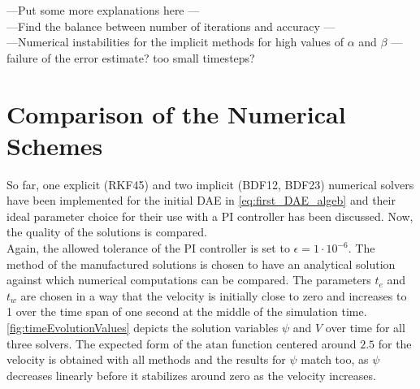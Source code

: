 ---Put some more explanations here --- \\
---Find the balance between number of iterations and accuracy --- \\
---Numerical instabilities for the implicit methods for high values of $\alpha$ and $\beta$ --- \\
failure of the error estimate? too small timesteps? \\ 

\section{Comparison of the Numerical Schemes}
So far, one explicit (RKF45) and two implicit (BDF12, BDF23) numerical solvers have been implemented for the initial DAE in \autoref{eq:first_DAE_algeb} and their ideal parameter choice for their use with a PI controller has been discussed. Now, the quality of the solutions is compared. \\
Again, the allowed tolerance of the PI controller is set to $\epsilon=1\cdot 10^{-6}$. The method of the manufactured solutions is chosen to have an analytical solution against which numerical computations can be compared. The parameters $t_e$ and $t_w$ are chosen in a way that the velocity is initially close to zero and increases to 1 over the time span of one second at the middle of the simulation time. \autoref{fig:timeEvolutionValues} depicts the solution variables $\psi$ and $V$ over time for all three solvers. The expected form of the $\text{atan}$ function centered around $2.5$ for the velocity is obtained with all methods and the results for $\psi$ match too, as $\psi$ decreases linearly before it stabilizes around zero as the velocity increases. \\
